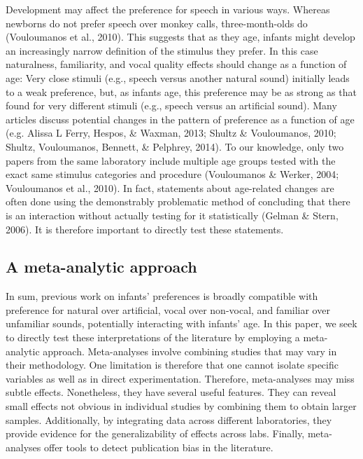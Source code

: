 \documentclass[man]{apa6}
\begin{document}
Development may affect the preference for speech in various ways.
Whereas newborns do not prefer speech over monkey calls,
three-month-olds do (Vouloumanos et al., 2010). This suggests that as
they age, infants might develop an increasingly narrow definition of the
stimulus they prefer. In this case naturalness, familiarity, and vocal
quality effects should change as a function of age: Very close stimuli
(e.g., speech versus another natural sound) initially leads to a weak
preference, but, as infants age, this preference may be as strong as
that found for very different stimuli (e.g., speech versus an artificial
sound). Many articles discuss potential changes in the pattern of
preference as a function of age (e.g. Alissa L Ferry, Hespos, \& Waxman,
2013; Shultz \& Vouloumanos, 2010; Shultz, Vouloumanos, Bennett, \&
Pelphrey, 2014). To our knowledge, only two papers from the same
laboratory include multiple age groups tested with the exact same
stimulus categories and procedure (Vouloumanos \& Werker, 2004;
Vouloumanos et al., 2010). In fact, statements about age-related changes
are often done using the demonstrably problematic method of concluding
that there is an interaction without actually testing for it
statistically (Gelman \& Stern, 2006). It is therefore important to
directly test these statements.

\subsection{A meta-analytic approach}\label{a-meta-analytic-approach}

In sum, previous work on infants' preferences is broadly compatible with
preference for natural over artificial, vocal over non-vocal, and
familiar over unfamiliar sounds, potentially interacting with infants'
age. In this paper, we seek to directly test these interpretations of
the literature by employing a meta-analytic approach. Meta-analyses
involve combining studies that may vary in their methodology. One
limitation is therefore that one cannot isolate specific variables as
well as in direct experimentation. Therefore, meta-analyses may miss
subtle effects. Nonetheless, they have several useful features. They can
reveal small effects not obvious in individual studies by combining them
to obtain larger samples. Additionally, by integrating data across
different laboratories, they provide evidence for the generalizability
of effects across labs. Finally, meta-analyses offer tools to detect
publication bias in the literature.
\end{document}
